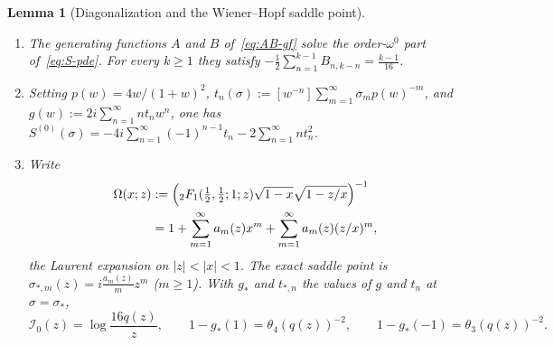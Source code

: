 \documentclass[twoside,10pt]{article}
\numberwithin{equation}{section}
\theoremstyle{slbody}
\newtheorem{lemma}[theorem]{Lemma}
\theoremstyle{definition}
\theoremstyle{remark}
\begin{document}
\begin{lemma}[Diagonalization and the Wiener--Hopf saddle point]
\label{lem:saddle}
\begin{enumerate}\setlength{\itemsep}{1pt}\setlength{\topsep}{3pt}
\item[(i)] The generating functions \(A\) and \(B\) of~\eqref{eq:AB-gf}
  solve the order-\(\omega^0\) part of~\eqref{eq:S-pde}.  For every \(k\geq1\) they satisfy
  \(-\frac12\sum_{n=1}^{k-1}B_{n,k-n}=\frac{k-1}{16}\).
\item[(ii)] Setting \(p(w)=4w/(1+w)^2\),
  \(t_n(\sigma):=[w^{-n}]\sum_{m=1}^\infty\sigma_m p(w)^{-m}\), and
  \(g(w):=2i\sum_{n=1}^\infty n t_n w^n\), one has
  \(S^{(0)}(\sigma)=-4i\sum_{n=1}^\infty(-1)^{n-1}t_n-2\sum_{n=1}^\infty n t_n^2\).
\item[(iii)] Write
  \begin{align*}
   \Omega(x;z)&:=\Bigl({}_2F_1(\tfrac12,\tfrac12;1;z)\sqrt{1-x}\sqrt{1-z/x}\Bigr)^{-1}\\
   &=1+\sum_{m=1}^\infty a_m(z)x^m+\sum_{m=1}^\infty a_m(z)(z/x)^m,
  \end{align*}
  the Laurent expansion on \(|z|<|x|<1\).  The exact saddle point is
  \(\sigma_{*,m}(z)=i\frac{a_m(z)}{m}z^m\) (\(m\geq1\)).  With \(g_*\) and
  \(t_{*,n}\) the values of \(g\) and \(t_n\) at \(\sigma=\sigma_*\),
  \begin{equation}\label{eq:saddle-values}
   \mathcal I_0(z)=\log\frac{16q(z)}{z},\qquad
   1-g_*(1)=\theta_4(q(z))^{-2},\qquad
   1-g_*(-1)=\theta_3(q(z))^{-2}.
  \end{equation}
\end{enumerate}
\end{lemma}
\end{document}
